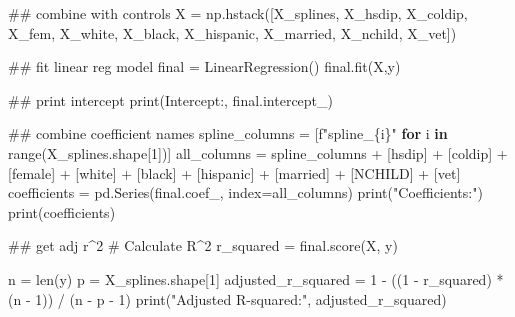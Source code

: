 \documentclass[
  letterpaper,
  DIV=11,
  numbers=noendperiod]{scrartcl}
\newenvironment{Shaded}{\begin{snugshade}}{\end{snugshade}}
\newcommand{\BuiltInTok}[1]{\textcolor[rgb]{0.00,0.23,0.31}{#1}}
\newcommand{\CommentTok}[1]{\textcolor[rgb]{0.37,0.37,0.37}{#1}}
\newcommand{\ControlFlowTok}[1]{\textcolor[rgb]{0.00,0.23,0.31}{\textbf{#1}}}
\newcommand{\DecValTok}[1]{\textcolor[rgb]{0.68,0.00,0.00}{#1}}
\newcommand{\KeywordTok}[1]{\textcolor[rgb]{0.00,0.23,0.31}{\textbf{#1}}}
\newcommand{\NormalTok}[1]{\textcolor[rgb]{0.00,0.23,0.31}{#1}}
\newcommand{\OperatorTok}[1]{\textcolor[rgb]{0.37,0.37,0.37}{#1}}
\newcommand{\SpecialCharTok}[1]{\textcolor[rgb]{0.37,0.37,0.37}{#1}}
\newcommand{\SpecialStringTok}[1]{\textcolor[rgb]{0.13,0.47,0.30}{#1}}
\newcommand{\StringTok}[1]{\textcolor[rgb]{0.13,0.47,0.30}{#1}}
\begin{document}
\begin{Shaded}
\begin{Highlighting}[]
\CommentTok{\#\# combine with controls }
\NormalTok{X }\OperatorTok{=}\NormalTok{ np.hstack([X\_splines, X\_hsdip, X\_coldip, X\_fem, X\_white, X\_black, X\_hispanic, X\_married, X\_nchild, X\_vet])}

\CommentTok{\#\# fit linear reg model }
\NormalTok{final }\OperatorTok{=}\NormalTok{ LinearRegression()}
\NormalTok{final.fit(X,y)}

\CommentTok{\#\# print intercept }
\BuiltInTok{print}\NormalTok{(}\StringTok{\textquotesingle{}Intercept:\textquotesingle{}}\NormalTok{, final.intercept\_)}

\CommentTok{\#\# combine coefficient names }
\NormalTok{spline\_columns }\OperatorTok{=}\NormalTok{ [}\SpecialStringTok{f"spline\_}\SpecialCharTok{\{}\NormalTok{i}\SpecialCharTok{\}}\SpecialStringTok{"} \ControlFlowTok{for}\NormalTok{ i }\KeywordTok{in} \BuiltInTok{range}\NormalTok{(X\_splines.shape[}\DecValTok{1}\NormalTok{])]}
\NormalTok{all\_columns }\OperatorTok{=}\NormalTok{ spline\_columns }\OperatorTok{+}\NormalTok{ [}\StringTok{\textquotesingle{}hsdip\textquotesingle{}}\NormalTok{] }\OperatorTok{+}\NormalTok{ [}\StringTok{\textquotesingle{}coldip\textquotesingle{}}\NormalTok{] }\OperatorTok{+}\NormalTok{ [}\StringTok{\textquotesingle{}female\textquotesingle{}}\NormalTok{] }\OperatorTok{+}\NormalTok{ [}\StringTok{\textquotesingle{}white\textquotesingle{}}\NormalTok{] }\OperatorTok{+}\NormalTok{ [}\StringTok{\textquotesingle{}black\textquotesingle{}}\NormalTok{] }\OperatorTok{+}\NormalTok{ [}\StringTok{\textquotesingle{}hispanic\textquotesingle{}}\NormalTok{] }\OperatorTok{+}\NormalTok{ [}\StringTok{\textquotesingle{}married\textquotesingle{}}\NormalTok{] }\OperatorTok{+}\NormalTok{ [}\StringTok{\textquotesingle{}NCHILD\textquotesingle{}}\NormalTok{] }\OperatorTok{+}\NormalTok{ [}\StringTok{\textquotesingle{}vet\textquotesingle{}}\NormalTok{]}
\NormalTok{coefficients }\OperatorTok{=}\NormalTok{ pd.Series(final.coef\_, index}\OperatorTok{=}\NormalTok{all\_columns)}
\BuiltInTok{print}\NormalTok{(}\StringTok{"Coefficients:"}\NormalTok{)}
\BuiltInTok{print}\NormalTok{(coefficients)}

\CommentTok{\#\# get adj r\^{}2}
\CommentTok{\# Calculate R\^{}2}
\NormalTok{r\_squared }\OperatorTok{=}\NormalTok{ final.score(X, y)}

\NormalTok{n }\OperatorTok{=} \BuiltInTok{len}\NormalTok{(y)  }
\NormalTok{p }\OperatorTok{=}\NormalTok{ X\_splines.shape[}\DecValTok{1}\NormalTok{]  }
\NormalTok{adjusted\_r\_squared }\OperatorTok{=} \DecValTok{1} \OperatorTok{{-}}\NormalTok{ ((}\DecValTok{1} \OperatorTok{{-}}\NormalTok{ r\_squared) }\OperatorTok{*}\NormalTok{ (n }\OperatorTok{{-}} \DecValTok{1}\NormalTok{)) }\OperatorTok{/}\NormalTok{ (n }\OperatorTok{{-}}\NormalTok{ p }\OperatorTok{{-}} \DecValTok{1}\NormalTok{)}
\BuiltInTok{print}\NormalTok{(}\StringTok{"Adjusted R{-}squared:"}\NormalTok{, adjusted\_r\_squared)}
\end{Highlighting}
\end{Shaded}
\end{document}

